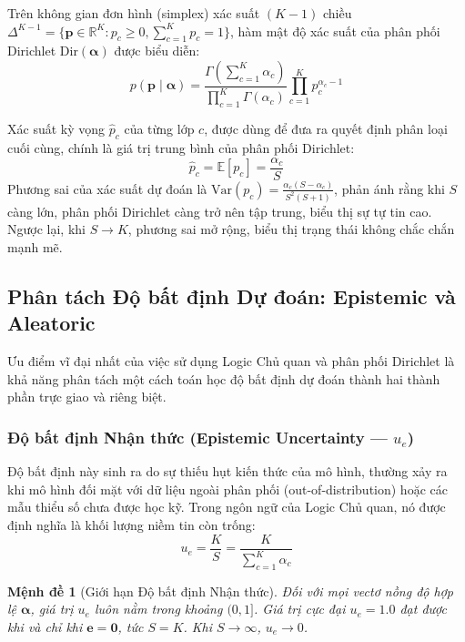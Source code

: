 \documentclass[11pt, a4paper]{article}
\newcommand{\Dir}{\text{Dir}}
\newcommand{\R}{\mathbb{R}}
\newcommand{\E}{\mathbb{E}}
\newtheorem{proposition}{Mệnh đề}
\begin{document}
Trên không gian đơn hình (simplex) xác suất $(K{-}1)$ chiều $\Delta^{K-1} = \{\bm{p} \in \R^K : p_c \ge 0, \sum_{c=1}^K p_c = 1\}$, hàm mật độ xác suất của phân phối Dirichlet $\Dir(\bm{\alpha})$ được biểu diễn:
\begin{equation}\label{eq:dirichlet_pdf}
    p(\bm{p} \mid \bm{\alpha}) = \frac{\Gamma\!\left(\sum_{c=1}^K \alpha_c\right)}{\prod_{c=1}^K \Gamma(\alpha_c)} \prod_{c=1}^K p_c^{\alpha_c - 1}
\end{equation}

Xác suất kỳ vọng $\hat{p}_c$ của từng lớp $c$, được dùng để đưa ra quyết định phân loại cuối cùng, chính là giá trị trung bình của phân phối Dirichlet:
\begin{equation}\label{eq:p_hat}
    \hat{p}_c = \E[p_c] = \frac{\alpha_c}{S}
\end{equation}
Phương sai của xác suất dự đoán là $\text{Var}(p_c) = \frac{\alpha_c(S - \alpha_c)}{S^2(S + 1)}$, phản ánh rằng khi $S$ càng lớn, phân phối Dirichlet càng trở nên tập trung, biểu thị sự tự tin cao. Ngược lại, khi $S \to K$, phương sai mở rộng, biểu thị trạng thái không chắc chắn mạnh mẽ.

\subsection{Phân tách Độ bất định Dự đoán: Epistemic và Aleatoric}\label{subsec:uncertainties}

Ưu điểm vĩ đại nhất của việc sử dụng Logic Chủ quan và phân phối Dirichlet là khả năng phân tách một cách toán học độ bất định dự đoán thành hai thành phần trực giao và riêng biệt.

\subsubsection{Độ bất định Nhận thức (Epistemic Uncertainty --- $u_e$)}

Độ bất định này sinh ra do sự thiếu hụt kiến thức của mô hình, thường xảy ra khi mô hình đối mặt với dữ liệu ngoài phân phối (out-of-distribution) hoặc các mẫu thiểu số chưa được học kỹ. Trong ngôn ngữ của Logic Chủ quan, nó được định nghĩa là khối lượng niềm tin còn trống:
\begin{equation}\label{eq:u_e}
    u_e = \frac{K}{S} = \frac{K}{\sum_{c=1}^K \alpha_c}
\end{equation}

\begin{proposition}[Giới hạn Độ bất định Nhận thức]
Đối với mọi vectơ nồng độ hợp lệ $\bm{\alpha}$, giá trị $u_e$ luôn nằm trong khoảng $(0, 1]$. Giá trị cực đại $u_e = 1.0$ đạt được khi và chỉ khi $\bm{e} = \bm{0}$, tức $S = K$. Khi $S \to \infty$, $u_e \to 0$.
\end{proposition}
\end{document}
